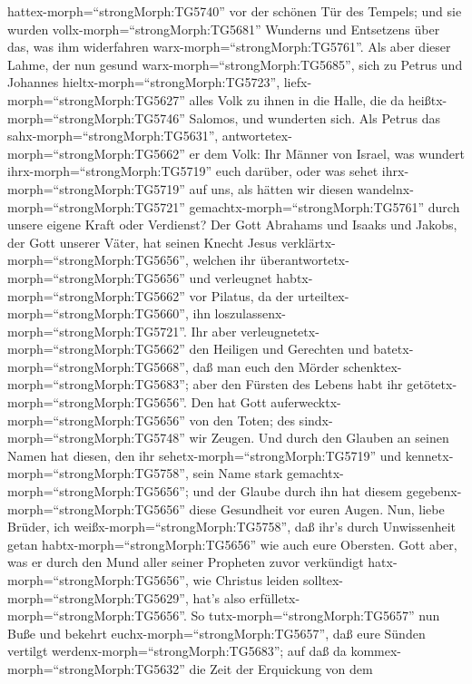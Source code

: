 hattex-morph=``strongMorph:TG5740'' vor der schönen Tür des Tempels; und
sie wurden vollx-morph=``strongMorph:TG5681'' Wunderns und Entsetzens
über das, was ihm widerfahren warx-morph=``strongMorph:TG5761''.
 Als aber dieser Lahme, der nun gesund
warx-morph=``strongMorph:TG5685'', sich zu Petrus und Johannes
hieltx-morph=``strongMorph:TG5723'', liefx-morph=``strongMorph:TG5627''
alles Volk zu ihnen in die Halle, die da
heißtx-morph=``strongMorph:TG5746'' Salomos, und wunderten sich.
 Als Petrus das sahx-morph=``strongMorph:TG5631'',
antwortetex-morph=``strongMorph:TG5662'' er dem Volk: Ihr Männer von
Israel, was wundert ihrx-morph=``strongMorph:TG5719'' euch darüber, oder
was sehet ihrx-morph=``strongMorph:TG5719'' auf uns, als hätten wir
diesen wandelnx-morph=``strongMorph:TG5721''
gemachtx-morph=``strongMorph:TG5761'' durch unsere eigene Kraft oder
Verdienst?  Der Gott Abrahams und Isaaks und Jakobs, der
Gott unserer Väter, hat seinen Knecht Jesus
verklärtx-morph=``strongMorph:TG5656'', welchen ihr
überantwortetx-morph=``strongMorph:TG5656'' und verleugnet
habtx-morph=``strongMorph:TG5662'' vor Pilatus, da der
urteiltex-morph=``strongMorph:TG5660'', ihn
loszulassenx-morph=``strongMorph:TG5721''.  Ihr aber
verleugnetetx-morph=``strongMorph:TG5662'' den Heiligen und Gerechten
und batetx-morph=``strongMorph:TG5668'', daß man euch den Mörder
schenktex-morph=``strongMorph:TG5683'';  aber den Fürsten
des Lebens habt ihr getötetx-morph=``strongMorph:TG5656''. Den hat Gott
auferwecktx-morph=``strongMorph:TG5656'' von den Toten; des
sindx-morph=``strongMorph:TG5748'' wir Zeugen.  Und durch
den Glauben an seinen Namen hat diesen, den ihr
sehetx-morph=``strongMorph:TG5719'' und
kennetx-morph=``strongMorph:TG5758'', sein Name stark
gemachtx-morph=``strongMorph:TG5656''; und der Glaube durch ihn hat
diesem gegebenx-morph=``strongMorph:TG5656'' diese Gesundheit vor euren
Augen.  Nun, liebe Brüder, ich
weißx-morph=``strongMorph:TG5758'', daß ihr's durch Unwissenheit getan
habtx-morph=``strongMorph:TG5656'' wie auch eure Obersten. 
Gott aber, was er durch den Mund aller seiner Propheten zuvor verkündigt
hatx-morph=``strongMorph:TG5656'', wie Christus leiden
solltex-morph=``strongMorph:TG5629'', hat's also
erfülletx-morph=``strongMorph:TG5656''.  So
tutx-morph=``strongMorph:TG5657'' nun Buße und bekehrt
euchx-morph=``strongMorph:TG5657'', daß eure Sünden vertilgt
werdenx-morph=``strongMorph:TG5683'';  auf daß da
kommex-morph=``strongMorph:TG5632'' die Zeit der Erquickung von dem
